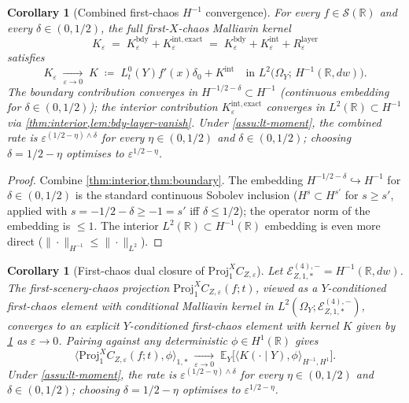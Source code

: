 \documentclass[11pt,reqno]{amsart}
\theoremstyle{plain}
\newtheorem{corollary}[theorem]{Corollary}
\theoremstyle{definition}
\theoremstyle{remark}
\newcommand{\R}{\mathbb{R}}
\newcommand{\E}{\mathbb{E}}
\newcommand{\Energy}{\mathcal{E}}
\newcommand{\IBM}{Z}
\begin{document}
\begin{corollary}[Combined first-chaos
\texorpdfstring{$H^{-1}$}{H\textasciicircum-1} convergence]
\label{cor:combined}
For every $f\in\mathscr S(\R)$ and every $\delta\in(0,1/2)$, the
full first-$X$-chaos Malliavin kernel
\[
 K_{\varepsilon}
 \;=\;K_{\varepsilon}^{\mathrm{bdy}}+K_{\varepsilon}^{\mathrm{int,exact}}
 \;=\;K_{\varepsilon}^{\mathrm{bdy}}+K_{\varepsilon}^{\mathrm{int}}+R_{\varepsilon}^{\mathrm{layer}}
\]
satisfies
\[
 K_{\varepsilon}\;\xrightarrow[\varepsilon\to 0]{}\;K
 \;\coloneqq\;L_{t}^{0}(Y)f'(x)\delta_{0}+K^{\mathrm{int}}
 \quad\text{in }L^{2}\bigl(\Omega_{Y};\,H^{-1}(\R,dw)\bigr).
\]
The boundary contribution converges in $H^{-1/2-\delta}\subset H^{-1}$
(continuous embedding for $\delta\in(0,1/2)$); the interior
contribution $K_{\varepsilon}^{\mathrm{int,exact}}$ converges in
$L^{2}(\R)\subset H^{-1}$ via \cref{thm:interior,lem:bdy-layer-vanish}.
Under \cref{assu:lt-moment}, the combined rate is
$\varepsilon^{(1/2-\eta)\wedge\delta}$ for every $\eta\in(0,1/2)$
and $\delta\in(0,1/2)$; choosing $\delta=1/2-\eta$ optimises to
$\varepsilon^{1/2-\eta}$.
\end{corollary}

\begin{proof}
Combine \cref{thm:interior,thm:boundary}. The embedding
$H^{-1/2-\delta}\hookrightarrow H^{-1}$ for $\delta\in(0,1/2)$ is
the standard continuous Sobolev inclusion
($H^{s}\subset H^{s'}$ for $s\ge s'$, applied with
$s=-1/2-\delta\ge -1=s'$ iff $\delta\le 1/2$); the operator norm of
the embedding is $\le 1$. The interior $L^{2}(\R)\subset H^{-1}(\R)$
embedding is even more direct ($\|\cdot\|_{H^{-1}}\le\|\cdot\|_{L^{2}}$).
\end{proof}

\begin{corollary}[First-chaos dual closure of
\texorpdfstring{$\mathrm{Proj}_{1}^{X}C_{\IBM,\varepsilon}$}{Proj\textasciicircum X\_1 C\_\{IBM,eps\}}]
\label{cor:proj1-closure}
Let $\Energy_{\IBM,1,*}^{(4),-}=H^{-1}(\R,dw)$. The first-scenery-chaos
projection $\mathrm{Proj}_{1}^{X}C_{\IBM,\varepsilon}(f;t)$, viewed
as a $Y$-conditioned first-chaos element with conditional Malliavin
kernel in $L^{2}(\Omega_{Y};\Energy_{\IBM,1,*}^{(4),-})$, converges
to an explicit $Y$-conditioned first-chaos element with kernel $K$
given by \cref{cor:combined} as $\varepsilon\to 0$. Pairing
against any deterministic $\phi\in H^{1}(\R)$ gives
\[
 \bigl\langle\mathrm{Proj}_{1}^{X}C_{\IBM,\varepsilon}(f;t),\phi\bigr\rangle_{1,*}
 \;\xrightarrow[\varepsilon\to 0]{}\;
 \E_{Y}\!\bigl[\langle K(\cdot\mid Y),\phi\rangle_{H^{-1},H^{1}}\bigr].
\]
Under \cref{assu:lt-moment}, the rate is
$\varepsilon^{(1/2-\eta)\wedge\delta}$ for every $\eta\in(0,1/2)$
and $\delta\in(0,1/2)$; choosing $\delta=1/2-\eta$ optimises to
$\varepsilon^{1/2-\eta}$.
\end{corollary}
\end{document}

